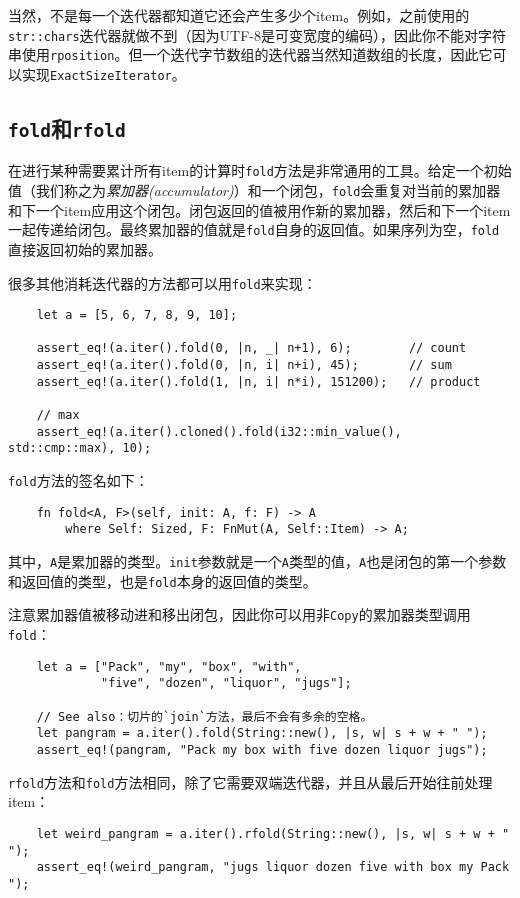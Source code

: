 当然，不是每一个迭代器都知道它还会产生多少个item。例如，之前使用的\texttt{str::chars}迭代器就做不到（因为UTF-8是可变宽度的编码），因此你不能对字符串使用\texttt{rposition}。但一个迭代字节数组的迭代器当然知道数组的长度，因此它可以实现\texttt{ExactSizeIterator}。

\subsection{\texttt{fold}和\texttt{rfold}}
在进行某种需要累计所有item的计算时\texttt{fold}方法是非常通用的工具。给定一个初始值（我们称之为\emph{累加器(accumulator)}）和一个闭包，\texttt{fold}会重复对当前的累加器和下一个item应用这个闭包。闭包返回的值被用作新的累加器，然后和下一个item一起传递给闭包。最终累加器的值就是\texttt{fold}自身的返回值。如果序列为空，\texttt{fold}直接返回初始的累加器。

很多其他消耗迭代器的方法都可以用\texttt{fold}来实现：
\begin{verbatim}
    let a = [5, 6, 7, 8, 9, 10];

    assert_eq!(a.iter().fold(0, |n, _| n+1), 6);        // count
    assert_eq!(a.iter().fold(0, |n, i| n+i), 45);       // sum
    assert_eq!(a.iter().fold(1, |n, i| n*i), 151200);   // product

    // max
    assert_eq!(a.iter().cloned().fold(i32::min_value(), std::cmp::max), 10);
\end{verbatim}

\texttt{fold}方法的签名如下：
\begin{verbatim}
    fn fold<A, F>(self, init: A, f: F) -> A
        where Self: Sized, F: FnMut(A, Self::Item) -> A;
\end{verbatim}

其中，\texttt{A}是累加器的类型。\texttt{init}参数就是一个\texttt{A}类型的值，\texttt{A}也是闭包的第一个参数和返回值的类型，也是\texttt{fold}本身的返回值的类型。

注意累加器值被移动进和移出闭包，因此你可以用非\texttt{Copy}的累加器类型调用\texttt{fold}：
\begin{verbatim}
    let a = ["Pack", "my", "box", "with",
             "five", "dozen", "liquor", "jugs"];
    
    // See also：切片的`join`方法，最后不会有多余的空格。
    let pangram = a.iter().fold(String::new(), |s, w| s + w + " ");
    assert_eq!(pangram, "Pack my box with five dozen liquor jugs");
\end{verbatim}

\texttt{rfold}方法和\texttt{fold}方法相同，除了它需要双端迭代器，并且从最后开始往前处理item：
\begin{verbatim}
    let weird_pangram = a.iter().rfold(String::new(), |s, w| s + w + " ");
    assert_eq!(weird_pangram, "jugs liquor dozen five with box my Pack ");
\end{verbatim}

